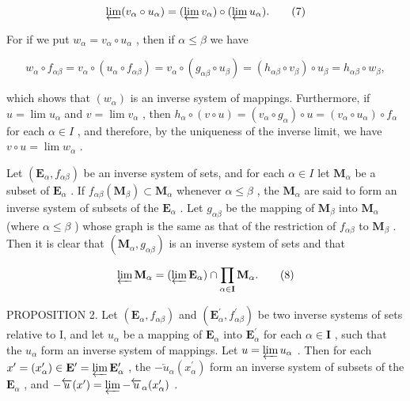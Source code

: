 \[
\varprojlim (v _ {\alpha} \circ u _ {\alpha}) = (\varprojlim v _ {\alpha}) \circ (\varprojlim u _ {\alpha}).\tag{7}
\]

For if we put \(w_{\alpha} = v_{\alpha} \circ u_{\alpha}\) , then if \(\alpha \leqslant \beta\) we have

\[
w _ {\alpha} \circ f _ {\alpha \beta} = v _ {\alpha} \circ (u _ {\alpha} \circ f _ {\alpha \beta}) = v _ {\alpha} \circ (g _ {\alpha \beta} \circ u _ {\beta}) = (h _ {\alpha \beta} \circ v _ {\beta}) \circ u _ {\beta} = h _ {\alpha \beta} \circ w _ {\beta},
\]

which shows that \((w_{\alpha})\) is an inverse system of mappings. Furthermore, if \(u = \lim u_{\alpha}\) and \(v = \lim v_{\alpha}\) , then \(h_{\alpha} \circ (v \circ u) = (v_{\alpha} \circ g_{\alpha}) \circ u = (v_{\alpha} \circ u_{\alpha}) \circ f_{\alpha}\) for each \(\alpha \in I\) , and therefore, by the uniqueness of the inverse limit, we have \(v \circ u = \lim w_{\alpha}\) .

Let \((\mathbf{E}_{\alpha}, f_{\alpha \beta})\) be an inverse system of sets, and for each \(\alpha \in I\) let \(\mathbf{M}_{\alpha}\) be a subset of \(\mathbf{E}_{\alpha}\) . If \(f_{\alpha \beta}(\mathbf{M}_{\beta}) \subset \mathbf{M}_{\alpha}\) whenever \(\alpha \leqslant \beta\) , the \(\mathbf{M}_{\alpha}\) are said to form an inverse system of subsets of the \(\mathbf{E}_{\alpha}\) . Let \(g_{\alpha \beta}\) be the mapping of \(\mathbf{M}_{\beta}\) into \(\mathbf{M}_{\alpha}\) (where \(\alpha \leqslant \beta\) ) whose graph is the same as that of the restriction of \(f_{\alpha \beta}\) to \(\mathbf{M}_{\beta}\) . Then it is clear that \((\mathbf{M}_{\alpha}, g_{\alpha \beta})\) is an inverse system of sets and that

\[
\varprojlim \mathbf {M} _ {\alpha} = (\varprojlim \mathbf {E} _ {\alpha}) \cap \prod_ {\alpha \in \mathbf {I}} \mathbf {M} _ {\alpha}.\tag{8}
\]

PROPOSITION 2. Let \((\mathbf{E}_{\alpha}, f_{\alpha \beta})\) and \((\mathbf{E}_{\alpha}^{\prime}, f_{\alpha \beta}^{\prime})\) be two inverse systems of sets relative to I, and let \(u_{\alpha}\) be a mapping of \(\mathbf{E}_{\alpha}\) into \(\mathbf{E}_{\alpha}^{\prime}\) for each \(\alpha \in \mathbf{I}\) , such that the \(u_{\alpha}\) form an inverse system of mappings. Let \(u = \varprojlim u_{\alpha}\) . Then for each \(x^{\prime} = (x_{\alpha}^{\prime}) \in \mathbf{E}^{\prime} = \varprojlim \mathbf{E}_{\alpha}^{\prime}\) , the \(-\overleftarrow{u}_{\alpha}(x_{\alpha}^{\prime})\) form an inverse system of subsets of the \(\mathbf{E}_{\alpha}\) , and \(-\overleftarrow{u}(x^{\prime}) = \varprojlim -\overleftarrow{u}_{\alpha}(x_{\alpha}^{\prime})\) .

